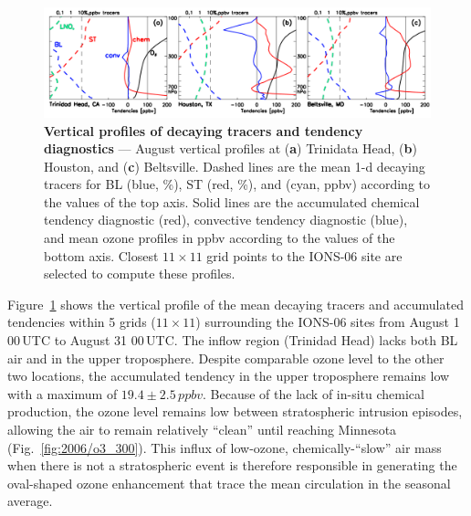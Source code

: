 	\begin{figure}[t!]
		\centering
		 \label{fig:2006/tendency_vertical} 
		\includegraphics[width=1.0\textwidth]{tendency/vertical.png}
		\caption[Vertical profiles of decaying tracers and tendency diagnostics]{\textbf{Vertical profiles of decaying tracers
		and tendency diagnostics} --- August vertical profiles at ({\bf a}) Trinidata Head, ({\bf b}) Houston,
		and ({\bf c}) Beltsville. Dashed lines are the mean 1-d decaying tracers for BL (blue, \unit{\%}), ST (red, \unit{\%}), and {\lnox} (cyan,
		\unit{ppbv}) according to the values of the top axis. Solid lines are the accumulated chemical tendency diagnostic (red), convective
		tendency diagnostic (blue), and mean ozone profiles in \unit{ppbv} according to the values of the bottom axis. Closest $11\times11$
		grid points to the IONS-06 site are selected to compute these profiles.}\vspace{-.3in}
	\end{figure}

Figure~\ref{fig:2006/tendency_vertical} shows the vertical profile of the mean decaying tracers and accumulated tendencies within 5 grids
($11\times11$) surrounding the IONS-06 sites from August 1 00\,\unit{UTC} to August 31 00\,\unit{UTC}. The inflow region (Trinidad Head)
lacks both BL air and {\lnox} in the upper troposphere. Despite comparable ozone level to the other two locations, the accumulated tendency in the upper
troposphere remains low with a maximum of $19.4\pm2.5\,\unit{ppbv}$. Because of the lack of in-situ chemical production, the ozone level remains
low between stratospheric intrusion episodes, allowing the air to remain relatively ``clean'' until reaching Minnesota (Fig.~\ref{fig:2006/o3_300}).
This influx of low-ozone, chemically-``slow'' air mass when there is not a stratospheric event is therefore responsible in generating the oval-shaped
ozone enhancement that trace the mean circulation in the seasonal average.

